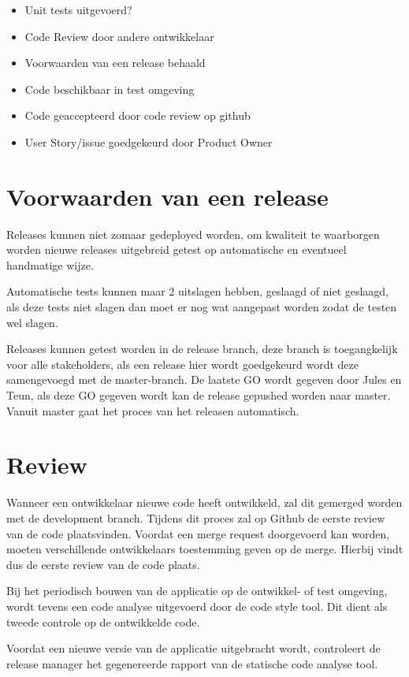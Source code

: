 	\begin{itemize}
			\item Unit tests uitgevoerd?
			\item Code Review door andere ontwikkelaar
			\item Voorwaarden van een release behaald
			\item Code beschikbaar in test omgeving
			\item Code geaccepteerd door code review op github
			\item User Story/issue goedgekeurd door Product Owner		
	\end{itemize}

\section{Voorwaarden van een release}
Releases kunnen niet zomaar gedeployed worden, om kwaliteit te waarborgen worden nieuwe releases uitgebreid getest op automatische en eventueel handmatige wijze.

Automatische tests kunnen maar 2 uitslagen hebben, geslaagd of niet geslaagd, als deze tests niet slagen dan moet er nog wat aangepast worden zodat de testen wel slagen.

Releases kunnen getest worden in de release branch, deze branch is toegangkelijk voor alle stakeholders, als een release hier wordt goedgekeurd wordt deze samengevoegd met de master-branch.
De laatste GO wordt gegeven door Jules en Teun, als deze GO gegeven wordt kan de release gepushed worden naar master.
Vanuit master gaat het proces van het releasen automatisch.

\section{Review}
Wanneer een ontwikkelaar nieuwe code heeft ontwikkeld, zal dit gemerged worden met de development branch. Tijdens dit proces zal op Github de eerste review van de code plaatsvinden. Voordat een merge request doorgevoerd kan worden, moeten verschillende ontwikkelaars toestemming geven op de merge. Hierbij vindt dus de eerste review van de code plaats.

Bij het periodisch bouwen van de applicatie op de ontwikkel- of test omgeving, wordt tevens een code analyse uitgevoerd door de code style tool. Dit dient als tweede controle op de ontwikkelde code.

Voordat een nieuwe versie van de applicatie uitgebracht wordt, controleert de release manager het gegenereerde rapport van de statische code analyse tool.

